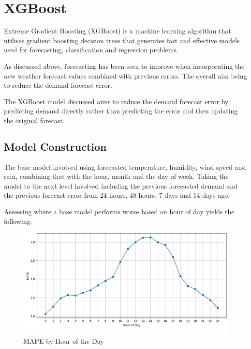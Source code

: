 \documentclass[mstat,12pt]{unswthesis}
\begin{document}
\section{XGBoost}\label{xgboost}

Extreme Gradient Boosting (XGBoost) is a machine learning algorithm that utilises gradient boosting decision trees that generates fast and effective models used for forecasting, classification and regression problems.

\bigskip

As discussed above, forecasting has been seen to improve when incorporating the new weather forecast values combined with previous errors. The overall aim being to reduce the demand forecast error.

\bigskip

The XGBoost model discussed aims to reduce the demand forecast error by predicting demand directly rather than predicting the error and then updating the original forecast.

\subsection{Model Construction}\label{model-construction-3}

The base model involved using forecasted temperature, humidity, wind speed and rain, combining that with the hour, month and the day of week. Taking the model to the next level involved including the previous forecasted demand and the previous forecast error from 24 hours, 48 hours, 7 days and 14 days ago.

\bigskip

Assessing where a base model performs worse based on hour of day yields the following.

\bigskip

\begin{figure}
\includegraphics[width=1\linewidth,height=0.3\textheight]{images/MAPEXGBoost} \caption{MAPE by Hour of the Day}\label{fig:MAPEXGBoost}
\end{figure}
\end{document}
